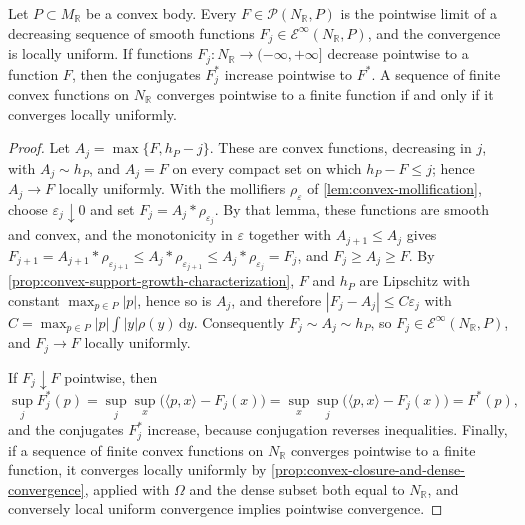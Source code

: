 \begin{proposition}\label{prop:convex-decreasing-smooth-growth-approximation}
Let $P\subset M_{\mathbb R}$ be a convex body. Every $F\in\mathcal P(N_{\mathbb R},P)$ is the pointwise limit of a decreasing sequence of smooth functions $F_j\in\mathcal E^\infty(N_{\mathbb R},P)$, and the convergence is locally uniform. If functions $F_j\colon N_{\mathbb R}\to(-\infty,+\infty]$ decrease pointwise to a function $F$, then the conjugates $F_j^*$ increase pointwise to $F^*$. A sequence of finite convex functions on $N_{\mathbb R}$ converges pointwise to a finite function if and only if it converges locally uniformly.
\end{proposition}
\begin{proof}
Let $A_j=\max\{F,h_P-j\}$. These are convex functions, decreasing in $j$, with $A_j\sim h_P$, and $A_j=F$ on every compact set on which $h_P-F\leq j$; hence $A_j\to F$ locally uniformly. With the mollifiers $\rho_\varepsilon$ of \cref{lem:convex-mollification}, choose $\varepsilon_j\downarrow0$ and set $F_j=A_j*\rho_{\varepsilon_j}$. By that lemma, these functions are smooth and convex, and the monotonicity in $\varepsilon$ together with $A_{j+1}\leq A_j$ gives $F_{j+1}=A_{j+1}*\rho_{\varepsilon_{j+1}}\leq A_j*\rho_{\varepsilon_{j+1}}\leq A_j*\rho_{\varepsilon_j}=F_j$, and $F_j\geq A_j\geq F$. By \cref{prop:convex-support-growth-characterization}, $F$ and $h_P$ are Lipschitz with constant $\max_{p\in P}|p|$, hence so is $A_j$, and therefore $|F_j-A_j|\leq C\varepsilon_j$ with $C=\max_{p\in P}|p|\int|y|\rho(y)\,\mathrm dy$. Consequently $F_j\sim A_j\sim h_P$, so $F_j\in\mathcal E^\infty(N_{\mathbb R},P)$, and $F_j\to F$ locally uniformly.

If $F_j\downarrow F$ pointwise, then
\[
 \sup_jF_j^*(p)=\sup_j\sup_x\bigl(\langle p,x\rangle-F_j(x)\bigr)=\sup_x\sup_j\bigl(\langle p,x\rangle-F_j(x)\bigr)=F^*(p),
\]
and the conjugates $F_j^*$ increase, because conjugation reverses inequalities. Finally, if a sequence of finite convex functions on $N_{\mathbb R}$ converges pointwise to a finite function, it converges locally uniformly by \cref{prop:convex-closure-and-dense-convergence}, applied with $\Omega$ and the dense subset both equal to $N_{\mathbb R}$, and conversely local uniform convergence implies pointwise convergence.
\end{proof}

